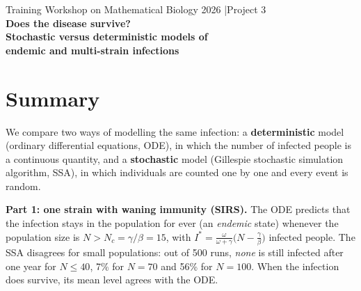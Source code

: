 \documentclass[11pt,a4paper]{article}
\newcommand{\hl}[1]{{\bfseries\color{aimsred}#1}}
\begin{document}
\begin{center}
{\large\color{gray} Training Workshop on Mathematical Biology 2026 \quad|\quad Project 3}\\[0.8em]
{\LARGE\bfseries\color{aimsred} Does the disease survive?}\\[0.4em]
{\Large\bfseries Stochastic versus deterministic models of\\ endemic and multi-strain infections}
\end{center}
\bigskip

\section*{Summary}

We compare two ways of modelling the same infection: a \hl{deterministic} model (ordinary differential equations, ODE), in which the number of infected people is a continuous quantity, and a \hl{stochastic} model (Gillespie stochastic simulation algorithm, SSA), in which individuals are counted one by one and every event is random.

\textbf{Part 1: one strain with waning immunity (SIRS).}
The ODE predicts that the infection stays in the population for ever (an \emph{endemic} state) whenever the population size is $N>N_c=\gamma/\beta=15$, with $I^*=\frac{\omega}{\omega+\gamma}\big(N-\frac{\gamma}{\beta}\big)$ infected people. The SSA disagrees for small populations: out of 500 runs, \emph{none} is still infected after one year for $N\le 40$, 7\% for $N=70$ and 56\% for $N=100$. When the infection does survive, its mean level agrees with the ODE.
\end{document}

